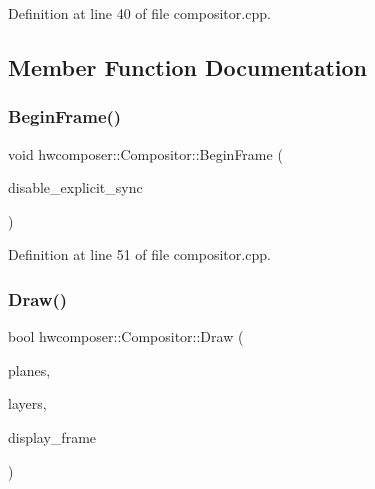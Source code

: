 Definition at line 40 of file compositor.\+cpp.


\begin{DoxyCode}{0}
\end{DoxyCode}


\subsection{Member Function Documentation}
\mbox{\label{classhwcomposer_1_1Compositor_a2a9da9e986a230cb68e322ed18ba4866}} 
\subsubsection{\texorpdfstring{Begin\+Frame()}{BeginFrame()}}
{\footnotesize\ttfamily void hwcomposer\+::\+Compositor\+::\+Begin\+Frame (\begin{DoxyParamCaption}\item[{bool}]{disable\+\_\+explicit\+\_\+sync }\end{DoxyParamCaption})}



Definition at line 51 of file compositor.\+cpp.


\begin{DoxyCode}{0}
\end{DoxyCode}
\mbox{\label{classhwcomposer_1_1Compositor_ad1b2b9db52224ab8e5ae906df0c58a28}} 
\subsubsection{\texorpdfstring{Draw()}{Draw()}}
{\footnotesize\ttfamily bool hwcomposer\+::\+Compositor\+::\+Draw (\begin{DoxyParamCaption}\item[{\mbox{\hyperlink{namespacehwcomposer_adf383ae435d39a5631a8ad82e7fa18a4}{Display\+Plane\+State\+List}} \&}]{planes,  }\item[{std\+::vector$<$ \mbox{\hyperlink{structhwcomposer_1_1OverlayLayer}{Overlay\+Layer}} $>$ \&}]{layers,  }\item[{const std\+::vector$<$ Hwc\+Rect$<$ int $>$$>$ \&}]{display\+\_\+frame }\end{DoxyParamCaption})}



